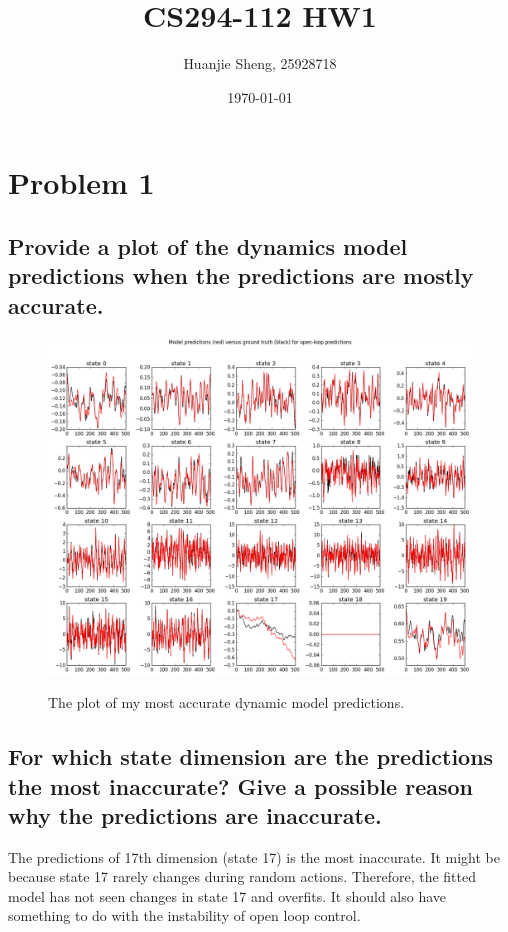 \documentclass[12pt]{article}
\begin{document}
	\title{CS294-112 HW1\vspace{-2ex}}
	\author{Huanjie Sheng, 25928718\vspace{-2ex}}
	\date{\today \vspace{-2ex}}
	
	\pagebreak
	
	\section{Problem 1}
	\subsection{Provide a plot of the dynamics model predictions when the predictions are mostly accurate.}
	\begin{figure}[!htbp] 
	 	\includegraphics[width=1.0\textwidth]{prediction_009.png}
	 	\label{fig:q1}
	 	\caption[caption]{The plot of my most accurate dynamic model predictions.}
	\end{figure}

	\subsection{For which state dimension are the predictions the most inaccurate? Give a possible reason why the predictions are inaccurate.}
	The predictions of 17th dimension (state 17) is the most inaccurate.  It might be because state 17 rarely changes during random actions.  Therefore, the fitted model has not seen changes in state 17 and overfits.  It should also have something to do with the instability of open loop control.
	
\end{document}
